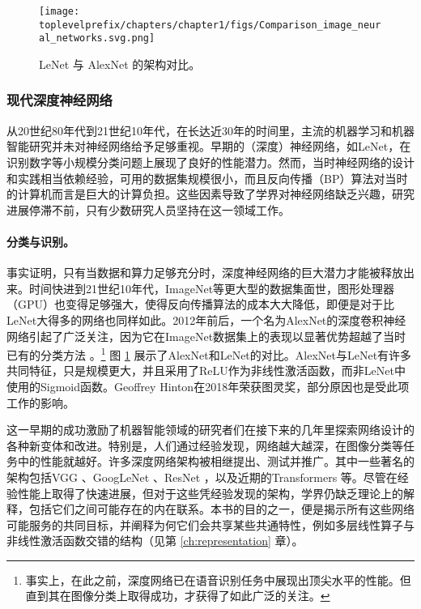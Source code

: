 \documentclass[../../book-main.tex]{subfiles}
\begin{document}
\begin{figure}
    \centering
    \texttt{[image: \\toplevelprefix/chapters/chapter1/figs/Comparison\_image\_neural\_networks.svg.png]}
    \caption{LeNet \cite{LeCun-1989} 与 AlexNet \cite{krizhevsky2012imagenet} 的架构对比。}
    \label{fig:LeNet-AlexNet}
\end{figure}


\subsubsection{现代深度神经网络}
从20世纪80年代到21世纪10年代，在长达近30年的时间里，主流的机器学习和机器智能研究并未对神经网络给予足够重视。早期的（深度）神经网络，如LeNet，在识别数字等小规模分类问题上展现了良好的性能潜力。然而，当时神经网络的设计和实践相当依赖经验，可用的数据集规模很小，而且反向传播（BP）算法对当时的计算机而言是巨大的计算负担。这些因素导致了学界对神经网络缺乏兴趣，研究进展停滞不前，只有少数研究人员坚持在这一领域工作。

\paragraph{分类与识别。}
事实证明，只有当数据和算力足够充分时，深度神经网络的巨大潜力才能被释放出来。时间快进到21世纪10年代，ImageNet等更大型的数据集面世，图形处理器（GPU）也变得足够强大，使得反向传播算法的成本大大降低，即便是对于比LeNet大得多的网络也同样如此。2012年前后，一个名为AlexNet的深度卷积神经网络引起了广泛关注，因为它在ImageNet数据集上的表现以显著优势超越了当时已有的分类方法 \cite{krizhevsky2012imagenet}。\footnote{事实上，在此之前，深度网络已在语音识别任务中展现出顶尖水平的性能。但直到其在图像分类上取得成功，才获得了如此广泛的关注。} 图 \ref{fig:LeNet-AlexNet} 展示了AlexNet和LeNet的对比。AlexNet与LeNet有许多共同特征，只是规模更大，并且采用了ReLU作为非线性激活函数，而非LeNet中使用的Sigmoid函数。Geoffrey Hinton在2018年荣获图灵奖，部分原因也是受此项工作的影响。

这一早期的成功激励了机器智能领域的研究者们在接下来的几年里探索网络设计的各种新变体和改进。特别是，人们通过经验发现，网络越大越深，在图像分类等任务中的性能就越好。许多深度网络架构被相继提出、测试并推广。其中一些著名的架构包括VGG \cite{Simonyan15}、GoogLeNet \cite{Szegedy2014GoingDW}、ResNet \cite{He2016-lc}，以及近期的Transformers \cite{vaswani2017attention} 等。尽管在经验性能上取得了快速进展，但对于这些凭经验发现的架构，学界仍缺乏理论上的解释，包括它们之间可能存在的内在联系。本书的目的之一，便是揭示所有这些网络可能服务的共同目标，并阐释为何它们会共享某些共通特性，例如多层线性算子与非线性激活函数交错的结构（见第 \ref{ch:representation} 章）。
\end{document}
